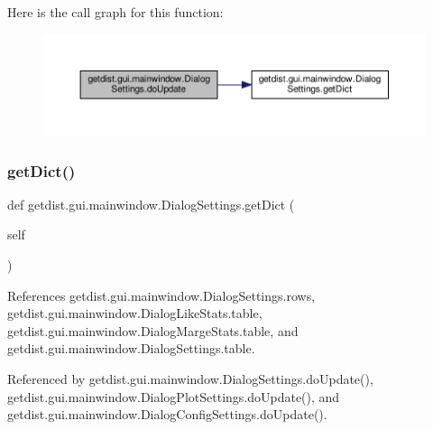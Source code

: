 Here is the call graph for this function\+:
\nopagebreak
\begin{figure}[H]
\begin{center}
\leavevmode
\includegraphics[width=350pt]{classgetdist_1_1gui_1_1mainwindow_1_1DialogSettings_a92e4be448141585df9a341119d8d8ae6_cgraph}
\end{center}
\end{figure}
\mbox{\label{classgetdist_1_1gui_1_1mainwindow_1_1DialogSettings_af11876f1336ee99c94531fbe9c939775}} 
\subsubsection{\texorpdfstring{get\+Dict()}{getDict()}}
{\footnotesize\ttfamily def getdist.\+gui.\+mainwindow.\+Dialog\+Settings.\+get\+Dict (\begin{DoxyParamCaption}\item[{}]{self }\end{DoxyParamCaption})}



References getdist.\+gui.\+mainwindow.\+Dialog\+Settings.\+rows, getdist.\+gui.\+mainwindow.\+Dialog\+Like\+Stats.\+table, getdist.\+gui.\+mainwindow.\+Dialog\+Marge\+Stats.\+table, and getdist.\+gui.\+mainwindow.\+Dialog\+Settings.\+table.



Referenced by getdist.\+gui.\+mainwindow.\+Dialog\+Settings.\+do\+Update(), getdist.\+gui.\+mainwindow.\+Dialog\+Plot\+Settings.\+do\+Update(), and getdist.\+gui.\+mainwindow.\+Dialog\+Config\+Settings.\+do\+Update().

